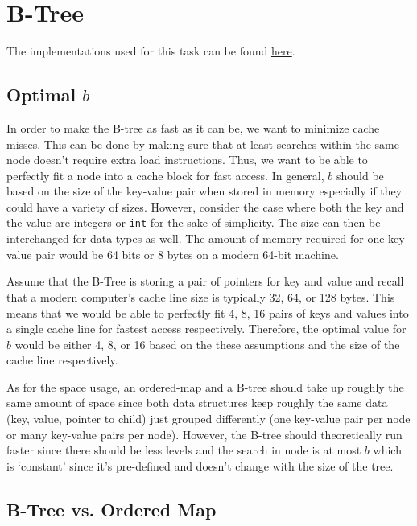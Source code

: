 \section{B-Tree}

\begin{tcolorbox}
	The implementations used for this task can be found \href{https://github.com/nngerncham/cs315_apal/tree/main/assignments/asn01/05-btree}{here}.
\end{tcolorbox}

\subsection{Optimal $b$}

In order to make the B-tree as fast as it can be, we want to minimize cache misses. This can be done by making sure that at least searches within the same node doesn't require extra load instructions. Thus, we want to be able to perfectly fit a node into a cache block for fast access.
In general, $b$ should be based on the size of the key-value pair when stored in memory especially if they could have a variety of sizes.
However, consider the case where both the key and the value are integers or \texttt{int} for the sake of simplicity.
The size can then be interchanged for data types as well.
The amount of memory required for one key-value pair would be 64 bits or 8 bytes on a modern 64-bit machine.

Assume that the B-Tree is storing a pair of pointers for key and value and recall that a modern computer's cache line size is typically 32, 64, or 128 bytes. This means that we would be able to perfectly fit 4, 8, 16 pairs of keys and values into a single cache line for fastest access respectively. Therefore, the optimal value for $b$ would be either 4, 8, or 16 based on the these assumptions and the size of the cache line respectively.

As for the space usage, an ordered-map and a B-tree should take up roughly the same amount of space since both data structures keep roughly the same data (key, value, pointer to child) just grouped differently (one key-value pair per node or many key-value pairs per node). However, the B-tree should theoretically run faster since there should be less levels and the search in node is at most $b$ which is `constant' since it's pre-defined and doesn't change with the size of the tree.

\subsection{B-Tree vs. Ordered Map}

